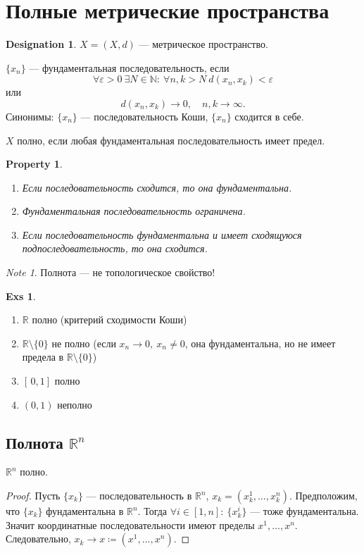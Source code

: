 \documentclass[11pt]{book}
\newcommand{\N}{\mathbb{N}}
\newcommand{\R}{\mathbb{R}}
\theoremstyle{definition}
\theoremstyle{plain}
\theoremstyle{plain}
\newtheorem*{prop}{Property}
\theoremstyle{definition}
\newtheorem*{exs}{Exs}
\newtheorem*{name}{Designation}
\theoremstyle{remark}
\newtheorem*{note}{Note}
\begin{document}
\section{Полные метрические пространства}
\begin{name}
    $ X = (X, d)$ --- метрическое пространство.
\end{name}
\begin{defn}
    $ \{x_n\}$ --- {\sf фундаментальная последовательность}, если \[
	\forall \varepsilon >0 ~ \exists N \in  \N: ~ \forall n, k > N ~ d(x_{n}, x_k) < \varepsilon
    \]
    или
    \[
	d(x_{n}, x_k ) \to  0, \quad n, k \to  \infty
    .\]
    Синонимы: $ \{x_{n}\}$ --- последовательность Коши, $ \{x_{n}\}$ сходится в себе.
\end{defn}
\begin{defn}
    $ X$ {\sf полно}, если любая фундаментальная последовательность имеет предел.
\end{defn}
\begin{prop}
    $ $
    \begin{enumerate}[noitemsep]
	\item Если последовательность сходится, то она фундаментальна.
	\item Фундаментальная последовательность ограничена.
	\item Если последовательность фундаментальна и имеет сходящуюся подпоследовательность, то она сходится.
    \end{enumerate}
\end{prop}
\begin{note}
    Полнота --- не топологическое свойство!
\end{note}
\begin{exs}
    $ $
    \begin{enumerate}[noitemsep]
	\item $ \R $ полно (критерий сходимости Коши)
	\item $ \R \setminus \{0\}$ не полно (если $ x_{n} \to  0, ~ x_{n}\ne 0$, она фундаментальна, но не имеет предела в $ \R \setminus \{0\}$)
	\item $ [\,0, 1]$ полно
	\item $ (0, 1)$  неполно
    \end{enumerate}
\end{exs}
\subsection{Полнота $ \R^{n}$}
\begin{thm}
    $ \R^{n} $ полно.
\end{thm}
\begin{proof}
    Пусть $ \{x_{k}\}$ --- последовательность в $ \R^{n} $, $ x_k = (x_k^{1}, \ldots , x_k^{n})$.
    Предположим, что $ \{x_{k}\}$  фундаментальна в $ \R^{n} $. Тогда $ \forall  i \in [1, n]: ~ \{x_k^{i}\}$ --- тоже фундаментальна. Значит координатные последовательности имеют пределы $ x^{1}, \ldots , x^{n}$. Следовательно, $ x_k \to x \coloneqq (x^{1}, \ldots , x^{n})$.
\end{proof}
\end{document}
